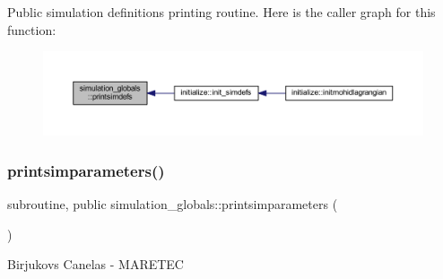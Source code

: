 Public simulation definitions printing routine. Here is the caller graph for this function\+:
\nopagebreak
\begin{figure}[H]
\begin{center}
\leavevmode
\includegraphics[width=350pt]{namespacesimulation__globals_a1683e8f5cab2101e7e3dbc91108b64a3_icgraph}
\end{center}
\end{figure}
\mbox{\label{namespacesimulation__globals_a1e5d10f7d7954c9d5346294c72a738c1}} 
\subsubsection{\texorpdfstring{printsimparameters()}{printsimparameters()}}
{\footnotesize\ttfamily subroutine, public simulation\+\_\+globals\+::printsimparameters (\begin{DoxyParamCaption}{ }\end{DoxyParamCaption})}



Birjukovs Canelas -\/ M\+A\+R\+E\+T\+EC 

